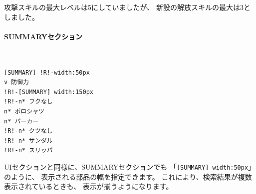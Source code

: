 \documentclass[dvipdfmx]{jsarticle}
\begin{document}
攻撃スキルの最大レベルは5にしていましたが、
新設の解放スキルの最大は3としました。

\begin{center}
\end{center}

\paragraph{SUMMARYセクション}~\medskip
{\footnotesize\begin{mdframed}\begin{Verbatim}[commandchars=!<>]
[SUMMARY] !R!-width:50px
v 防御力
!R!-[SUMMARY] width:150px
!R!-n* フクなし
n* ポロシャツ
n* パーカー
!R!-n* クツなし
!R!-n* サンダル
!R!-n* スリッパ
\end{Verbatim}
\end{mdframed}}
\medskip

UIセクションと同様に、SUMMARYセクションでも
「\texttt{[SUMMARY] width:50px}」のように、
表示される部品の幅を指定できます。
これにより、検索結果が複数表示されているときも、
表示が揃うようになります。

\begin{center}
\end{center}
\end{document}
